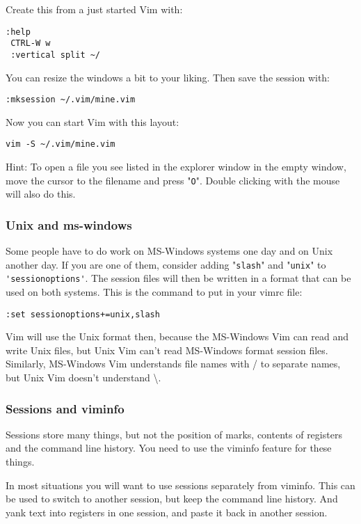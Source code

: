 Create this from a just started Vim with:

\begin{Verbatim}[samepage=true]
 :help
 CTRL-W w
 :vertical split ~/
\end{Verbatim}

You can resize the windows a bit to your liking.
Then save the session with:

\begin{Verbatim}[samepage=true]
 :mksession ~/.vim/mine.vim
\end{Verbatim}

Now you can start Vim with this layout:

\begin{Verbatim}[samepage=true]
 vim -S ~/.vim/mine.vim
\end{Verbatim}

Hint: To open a file you see listed in the explorer window in the empty window, move the cursor to the filename and press "\verb!O!".
Double clicking with the mouse will also do this.

\subsubsection{Unix and ms-windows}
Some people have to do work on MS-Windows systems one day and on Unix another day.
If you are one of them, consider adding "\verb!slash!" and "\verb!unix!" to \verb!'sessionoptions'!.
The session files will then be written in a format that can be used on both systems.
This is the command to put in your vimrc file:

\begin{Verbatim}[samepage=true]
 :set sessionoptions+=unix,slash
\end{Verbatim}

Vim will use the Unix format then, because the MS-Windows Vim can read and write Unix files, but Unix Vim can't read MS-Windows format session files.
Similarly, MS-Windows Vim understands file names with / to separate names, but Unix Vim doesn't understand \textbackslash.
\subsubsection{Sessions and viminfo}
Sessions store many things, but not the position of marks, contents of registers and the command line history.
You need to use the viminfo feature for these things.

In most situations you will want to use sessions separately from viminfo.
This can be used to switch to another session, but keep the command line history.
And yank text into registers in one session, and paste it back in another session.

